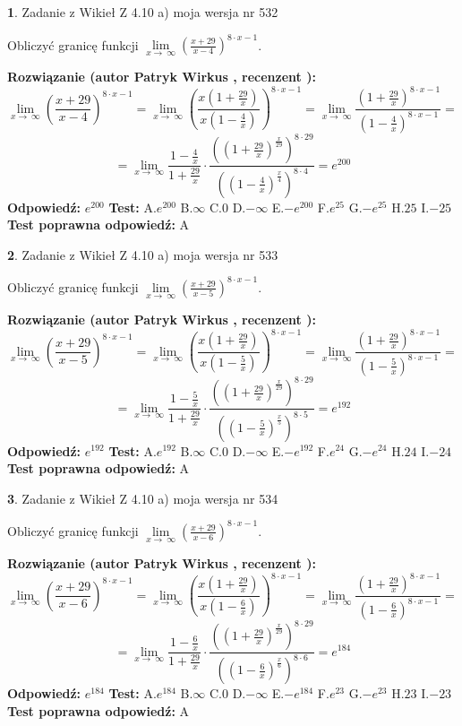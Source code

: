 \documentclass[12pt, a4paper]{article}
\theoremstyle{definition} %
\newtheorem{zad}{}
\newcommand{\zadStart}[1]{\begin{zad}#1\newline}
\newcommand{\zadStop}{\end{zad}}
\newcommand{\rozwStart}[2]{\noindent \textbf{Rozwiązanie (autor #1 , recenzent #2): }\newline}
\newcommand{\rozwStop}{\newline}
\newcommand{\odpStart}{\noindent \textbf{Odpowiedź:}\newline}
\newcommand{\odpStop}{\newline}
\newcommand{\testStart}{\noindent \textbf{Test:}\newline}
\newcommand{\testStop}{\newline}
\newcommand{\kluczStart}{\noindent \textbf{Test poprawna odpowiedź:}\newline}
\newcommand{\kluczStop}{\newline}
\begin{document}
\zadStart{Zadanie z Wikieł Z 4.10 a) moja wersja nr 532}

Obliczyć granicę funkcji  $\lim\limits_{x\to\ \infty}(\frac{x+29}{x-4})^{8\cdot x-1}$.
\zadStop
\rozwStart{Patryk Wirkus}{}
$$\lim\limits_{x\to\ \infty}(\frac{x+29}{x-4})^{8\cdot x-1} = \lim\limits_{x\to\ \infty}(\frac{x(1+\frac{29}{x})}{x(1-\frac{4}{x})})^{8\cdot x-1}=\lim\limits_{x\to\ \infty}\frac{(1+\frac{29}{x})^{8\cdot x-1}}{(1-\frac{4}{x})^{8\cdot x-1}}=$$
$$=\lim\limits_{x\to\ \infty}\frac{1-\frac{4}{x}}{1+\frac{29}{x}}\cdot\frac{((1+\frac{29}{x})^{\frac{x}{29}})^{8\cdot29}}{((1-\frac{4}{x})^{\frac{x}{4}})^{8\cdot4}}=e^{200}$$
\rozwStop
\odpStart
$e^{200}$
\odpStop
\testStart
A.$e^{200}$ B.$\infty$ C.$0$ D.$-\infty$ E.$-e^{200}$
F.$e^{25}$ G.$-e^{25}$
H.$25$
I.$-25$
\testStop
\kluczStart
A
\kluczStop



\zadStart{Zadanie z Wikieł Z 4.10 a) moja wersja nr 533}

Obliczyć granicę funkcji  $\lim\limits_{x\to\ \infty}(\frac{x+29}{x-5})^{8\cdot x-1}$.
\zadStop
\rozwStart{Patryk Wirkus}{}
$$\lim\limits_{x\to\ \infty}(\frac{x+29}{x-5})^{8\cdot x-1} = \lim\limits_{x\to\ \infty}(\frac{x(1+\frac{29}{x})}{x(1-\frac{5}{x})})^{8\cdot x-1}=\lim\limits_{x\to\ \infty}\frac{(1+\frac{29}{x})^{8\cdot x-1}}{(1-\frac{5}{x})^{8\cdot x-1}}=$$
$$=\lim\limits_{x\to\ \infty}\frac{1-\frac{5}{x}}{1+\frac{29}{x}}\cdot\frac{((1+\frac{29}{x})^{\frac{x}{29}})^{8\cdot29}}{((1-\frac{5}{x})^{\frac{x}{5}})^{8\cdot5}}=e^{192}$$
\rozwStop
\odpStart
$e^{192}$
\odpStop
\testStart
A.$e^{192}$ B.$\infty$ C.$0$ D.$-\infty$ E.$-e^{192}$
F.$e^{24}$ G.$-e^{24}$
H.$24$
I.$-24$
\testStop
\kluczStart
A
\kluczStop



\zadStart{Zadanie z Wikieł Z 4.10 a) moja wersja nr 534}

Obliczyć granicę funkcji  $\lim\limits_{x\to\ \infty}(\frac{x+29}{x-6})^{8\cdot x-1}$.
\zadStop
\rozwStart{Patryk Wirkus}{}
$$\lim\limits_{x\to\ \infty}(\frac{x+29}{x-6})^{8\cdot x-1} = \lim\limits_{x\to\ \infty}(\frac{x(1+\frac{29}{x})}{x(1-\frac{6}{x})})^{8\cdot x-1}=\lim\limits_{x\to\ \infty}\frac{(1+\frac{29}{x})^{8\cdot x-1}}{(1-\frac{6}{x})^{8\cdot x-1}}=$$
$$=\lim\limits_{x\to\ \infty}\frac{1-\frac{6}{x}}{1+\frac{29}{x}}\cdot\frac{((1+\frac{29}{x})^{\frac{x}{29}})^{8\cdot29}}{((1-\frac{6}{x})^{\frac{x}{6}})^{8\cdot6}}=e^{184}$$
\rozwStop
\odpStart
$e^{184}$
\odpStop
\testStart
A.$e^{184}$ B.$\infty$ C.$0$ D.$-\infty$ E.$-e^{184}$
F.$e^{23}$ G.$-e^{23}$
H.$23$
I.$-23$
\testStop
\kluczStart
A
\kluczStop
\end{document}
